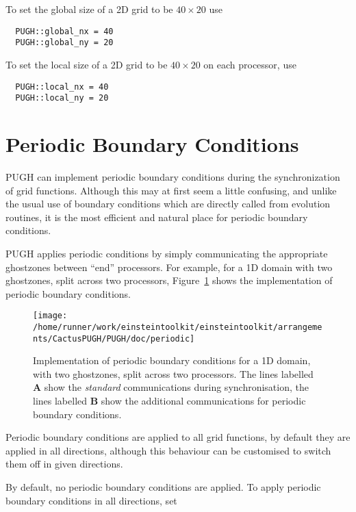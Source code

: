 \documentclass{article}
\begin{document}
To set the global size of a 2D grid to be $40\times 20$ use

\begin{verbatim}
  PUGH::global_nx = 40
  PUGH::global_ny = 20
\end{verbatim}

To set the local size of a 2D grid to be $40\times 20$ on each processor, use

\begin{verbatim}
  PUGH::local_nx = 40
  PUGH::local_ny = 20
\end{verbatim}


\section{Periodic Boundary Conditions}

PUGH can implement periodic boundary conditions during the synchronization
of grid functions. Although this may at first seem a little confusing, and
unlike the usual use of boundary conditions which are directly called from
evolution routines, it is the most efficient and natural place for periodic
boundary conditions.

PUGH applies periodic conditions by simply communicating the appropriate
ghostzones between ``end'' processors. For example, for a 1D domain with two
ghostzones, split across two processors, Figure~\ref{pugh::fig1} shows the implementation of periodic boundary conditions.

\begin{figure}[ht]
\begin{center}
\texttt{[image: /home/runner/work/einsteintoolkit/einsteintoolkit/arrangements/CactusPUGH/PUGH/doc/periodic]}
\end{center}
\caption[]{Implementation of periodic boundary conditions for a 1D domain, with two ghostzones, split across two processors. The lines labelled {\bf A} show the {\it standard} communications during synchronisation, the lines labelled
{\bf B} show the additional communications for periodic boundary conditions.}
\label{pugh::fig1}
\end{figure}

Periodic boundary conditions are applied to all grid functions, by default
they are applied in all directions, although this behaviour can be customised
to switch them off in given directions.

By default, no periodic boundary conditions are applied. To apply periodic boundary conditions in all directions, set
\end{document}
